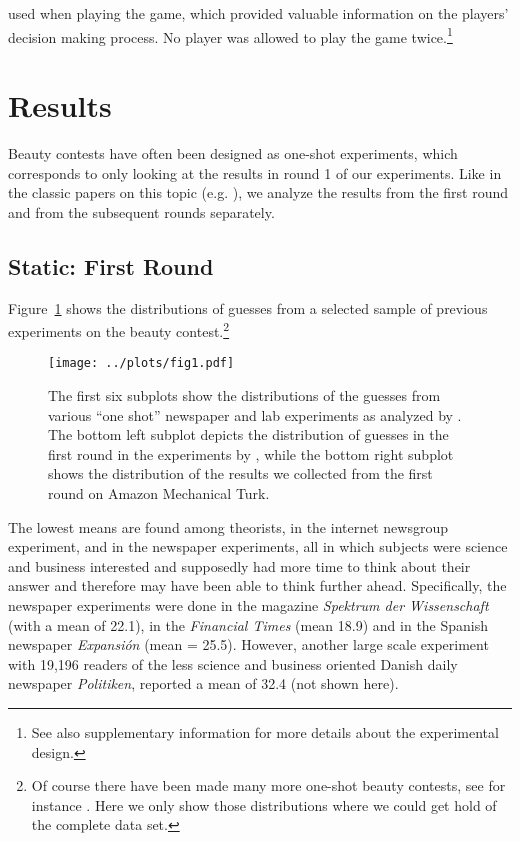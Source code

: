 \documentclass[12pt,review]{elsarticle}
\begin{document}
used when playing the game, which provided valuable information on
the players\textquoteright{} decision making process. No player was
allowed to play the game twice.\footnote{See also supplementary information for more details about the experimental
design.}

\section{Results\label{sec:Results}}
\noindent
Beauty contests have often been designed as one-shot experiments,
which corresponds to only looking at the results in round 1 of our
experiments. Like in the classic papers on this topic (e.g. \citet{Nagel95, HoCamererWeigelt98}),
we analyze the results from the first round and from the subsequent
rounds separately.

\subsection{Static: First Round\label{subsec:Static:-First-Round}}
\noindent
Figure~\ref{fig:all-distributions} shows the distributions of guesses from a selected sample of previous experiments on the beauty contest.\footnote{Of course there have been made many more one-shot beauty contests, see for instance \citet{schou2005gaet, rubinstein2007instinctive}. Here we only show those distributions where we could get hold of the complete data set.}

\begin{figure}
\texttt{[image: ../plots/fig1.pdf]}\caption{The first six subplots show the distributions of the guesses from various ``one shot'' newspaper \cite{Thaler1997competition, selten1998zahlenwahlspiel, bosch1997juego} and lab experiments as analyzed by \citet{NagelEtAl02}. The bottom left subplot depicts the distribution of guesses in the first round in the experiments by \citet{Nagel95}, while the bottom right subplot shows the distribution of the results we collected from the first round on Amazon Mechanical Turk.}
\label{fig:all-distributions}
\end{figure}

The lowest means are found among theorists, in the internet newsgroup experiment, and in the newspaper experiments, all in which subjects were science and business interested and supposedly had more time to think about their answer and therefore may have been able to think further ahead. Specifically, the newspaper experiments were done in the magazine \textit{Spektrum der Wissenschaft} \cite{selten1998zahlenwahlspiel} (with a mean of 22.1), in the \textit{Financial Times} \cite{Thaler1997competition} (mean 18.9) and in the Spanish newspaper \textit{Expansión} \cite{NagelEtAl02} (mean = 25.5). However, another large scale experiment with 19,196 readers of the less science and business oriented Danish daily newspaper \textit{Politiken}, reported a mean of 32.4 \cite{schou2005gaet} (not shown here).
\end{document}
